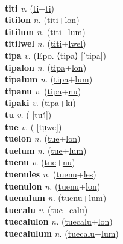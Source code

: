  \label{'titanium} \\
\textbf{titi} \textit{v.} (\hyperref[ti]{ti}+\hyperref[ti]{ti})
 \label{titi} \\
\textbf{titilon} \textit{n.} (\hyperref[titi]{titi}+\hyperref[lon]{lon})
 \label{titilon} \\
\textbf{titilum} \textit{n.} (\hyperref[titi]{titi}+\hyperref[lum]{lum})
 \label{titilum} \\
\textbf{titilwel} \textit{n.} (\hyperref[titi]{titi}+\hyperref[lwel]{lwel})
 \label{titilwel} \\
\textbf{tipa} \textit{v.} (Epo. ⟨tipa⟩ [ˈtipa])
 \label{tipa} \\
\textbf{tipalon} \textit{n.} (\hyperref[tipa]{tipa}+\hyperref[lon]{lon})
 \label{tipalon} \\
\textbf{tipalum} \textit{n.} (\hyperref[tipa]{tipa}+\hyperref[lum]{lum})
 \label{tipalum} \\
\textbf{tipanu} \textit{v.} (\hyperref[tipa]{tipa}+\hyperref[nu]{nu})
 \label{tipanu} \\
\textbf{tipaki} \textit{v.} (\hyperref[tipa]{tipa}+\hyperref[ki]{ki})
 \label{tipaki} \\
\textbf{tu} \textit{v.} ( [tu˧˥])
 \label{tu} \\
\textbf{tue} \textit{v.} ( [tṳwe])
 \label{tue} \\
\textbf{tuelon} \textit{n.} (\hyperref[tue]{tue}+\hyperref[lon]{lon})
 \label{tuelon} \\
\textbf{tuelum} \textit{n.} (\hyperref[tue]{tue}+\hyperref[lum]{lum})
 \label{tuelum} \\
\textbf{tuenu} \textit{v.} (\hyperref[tue]{tue}+\hyperref[nu]{nu})
 \label{tuenu} \\
\textbf{tuenules} \textit{n.} (\hyperref[tuenu]{tuenu}+\hyperref[les]{les})
 \label{tuenules} \\
\textbf{tuenulon} \textit{n.} (\hyperref[tuenu]{tuenu}+\hyperref[lon]{lon})
 \label{tuenulon} \\
\textbf{tuenulum} \textit{n.} (\hyperref[tuenu]{tuenu}+\hyperref[lum]{lum})
 \label{tuenulum} \\
\textbf{tuecalu} \textit{v.} (\hyperref[tue]{tue}+\hyperref[calu]{calu})
 \label{tuecalu} \\
\textbf{tuecalulon} \textit{n.} (\hyperref[tuecalu]{tuecalu}+\hyperref[lon]{lon})
 \label{tuecalulon} \\
\textbf{tuecalulum} \textit{n.} (\hyperref[tuecalu]{tuecalu}+\hyperref[lum]{lum})
 \label{tuecalulum} \\
